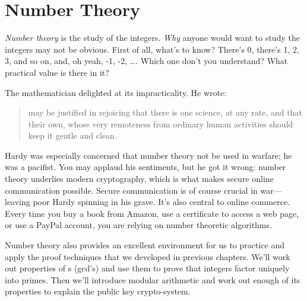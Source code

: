 \chapter{Number Theory}\label{number_theory_chap}

\emph{Number theory} is the study of the
integers.  \emph{Why} anyone would want to study the integers may not
be obvious.  First of all, what's to know?  There's 0, there's 1, 2,
3, and so on, and, oh yeah, -1, -2, \dots.  Which one don't you
understand?  What practical value is there in it?

\iffalse Number theory is at the core of mathematics; even Ug the
Caveman surely had some grasp of the integers---at least the positive
ones.  In fact, the integers are so elementary that one might ask,
``What's to study?''  There's 0, there's 1, 2, 3 and so on, and
there's the negatives.  Which one don't you understand?  Doesn't math
become easy when we don't have to worry about nasty numbers like
$\sqrt{7}$, $1 / \pi$, and $i$?  We can even forget about fractions!
\fi

The mathematician  delighted 
at its impracticality.  He wrote:

 \begin{quotation}
  may be justified in rejoicing that there
 is one science, at any rate, and that their own, whose very
 remoteness from ordinary human activities should keep it gentle and
 clean.
 \end{quotation}

Hardy was especially concerned that number theory not be used in
warfare; he was a pacifist.  You may applaud his sentiments, but he
got it wrong: number theory underlies modern cryptography, which is
what makes secure online communication possible.  Secure communication
is of course crucial in war---leaving poor Hardy spinning in
his grave.  It's also central to online commerce.  Every time you buy
a book from Amazon, use a certificate to access a web page, or use a
PayPal account, you are relying on number theoretic algorithms.

Number theory also provides an excellent environment for us to
practice and apply the proof techniques that we developed in previous
chapters.  We'll work out properties of s
(gcd's) and use them to prove that integers factor uniquely into
primes.  Then we'll introduce modular arithmetic and work out enough
of its properties to explain the  public key crypto-system.

